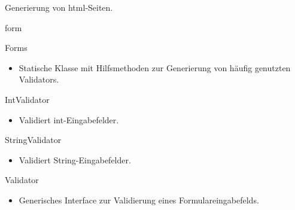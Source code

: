 \documentclass[parskip=full]{scrartcl}
\newcommand{\code}[1]{{\ttfamily #1}}
\begin{document}
\begin{itemPackage}
\begin{itemize}
  Generierung von \code{html}-Seiten.
\end{itemize}
\item form
\begin{itemClass}
\item Forms
\begin{itemize}
  \item Statische Klasse mit Hilfsmethoden zur Generierung von häufig genutzten
  \code{Validators}.
\end{itemize}
\item IntValidator
\begin{itemize}
  \item Validiert \code{int}-Eingabefelder.
\end{itemize}
\item StringValidator
\begin{itemize}
  \item Validiert \code{String}-Eingabefelder.
\end{itemize}
\item Validator
\begin{itemize}
  \item Generisches Interface zur Validierung eines Formulareingabefelds.
\end{itemize}
\end{itemClass}
\end{itemPackage}
\end{document}

